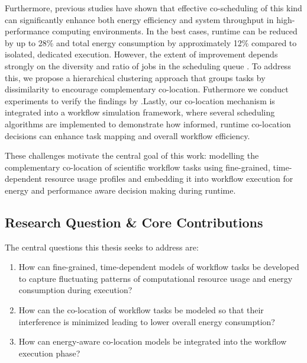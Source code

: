 Furthermore, previous studies have shown that effective co-scheduling of this kind can significantly enhance both energy efficiency and system throughput in high-performance computing environments. In the best cases, runtime can be reduced by up to 28\% and total energy consumption by approximately 12\% compared to isolated, dedicated execution. However, the extent of improvement depends strongly on the diversity and ratio of jobs in the scheduling queue \cite{7349920}. To address this, we propose a hierarchical clustering approach that groups tasks by dissimilarity to encourage complementary co-location. Futhermore we conduct experiments to verify the findings by \cite{inproceedings}.Lastly, our co-location mechanism is integrated into a workflow simulation framework, where several scheduling algorithms are implemented to demonstrate how informed, runtime co-location decisions can enhance task mapping and overall workflow efficiency.

These challenges motivate the central goal of this work: modelling the complementary co-location of scientific workflow tasks using fine-grained, time-dependent resource usage profiles and embedding it into workflow execution for energy and performance aware decision making during runtime.

\subsection{Research Question \& Core Contributions}
\label{subse:research_question_core_contributions}

The central questions this thesis seeks to address are:

\begin{enumerate}[label=\textbf{RQ}\arabic*]
    \item How can fine-grained, time-dependent models of workflow tasks be developed to capture fluctuating patterns of computational resource usage and energy consumption during execution?
    \item How can the co-location of workflow tasks be modeled so that their interference is minimized leading to lower overall energy consumption?
    \item How can energy-aware co-location models be integrated into the workflow execution phase?
\end{enumerate}

